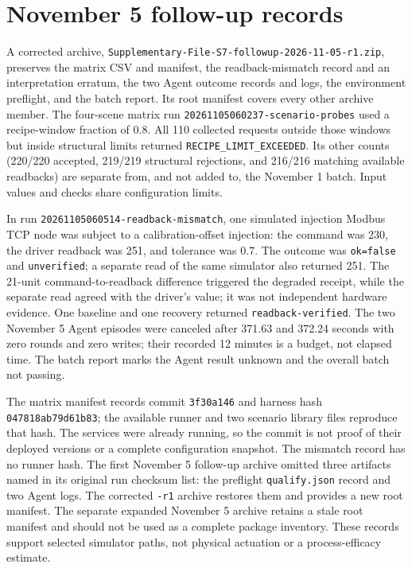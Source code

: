 \documentclass[10pt]{article}
\begin{document}
\section*{November 5 follow-up records}
A corrected archive, \texttt{Supplementary-File-S7-followup-2026-11-05-r1.zip}, preserves the matrix CSV and manifest, the readback-mismatch record and an interpretation erratum, the two Agent outcome records and logs, the environment preflight, and the batch report. Its root manifest covers every other archive member. The four-scene matrix run \texttt{20261105060237-scenario-probes} used a recipe-window fraction of 0.8. All 110 collected requests outside those windows but inside structural limits returned \texttt{RECIPE\_LIMIT\_EXCEEDED}. Its other counts (220/220 accepted, 219/219 structural rejections, and 216/216 matching available readbacks) are separate from, and not added to, the November 1 batch. Input values and checks share configuration limits.

In run \texttt{20261105060514-readback-mismatch}, one simulated injection Modbus TCP node was subject to a calibration-offset injection: the command was 230, the driver readback was 251, and tolerance was 0.7. The outcome was \texttt{ok=false} and \texttt{unverified}; a separate read of the same simulator also returned 251. The 21-unit command-to-readback difference triggered the degraded receipt, while the separate read agreed with the driver's value; it was not independent hardware evidence. One baseline and one recovery returned \texttt{readback-verified}. The two November 5 Agent episodes were canceled after 371.63 and 372.24 seconds with zero rounds and zero writes; their recorded 12 minutes is a budget, not elapsed time. The batch report marks the Agent result unknown and the overall batch not passing.

The matrix manifest records commit \texttt{3f30a146} and harness hash \texttt{047818ab79d61b83}; the available runner and two scenario library files reproduce that hash. The services were already running, so the commit is not proof of their deployed versions or a complete configuration snapshot. The mismatch record has no runner hash. The first November 5 follow-up archive omitted three artifacts named in its original run checksum list: the preflight \texttt{qualify.json} record and two Agent logs. The corrected \texttt{-r1} archive restores them and provides a new root manifest. The separate expanded November 5 archive retains a stale root manifest and should not be used as a complete package inventory. These records support selected simulator paths, not physical actuation or a process-efficacy estimate.
\end{document}
